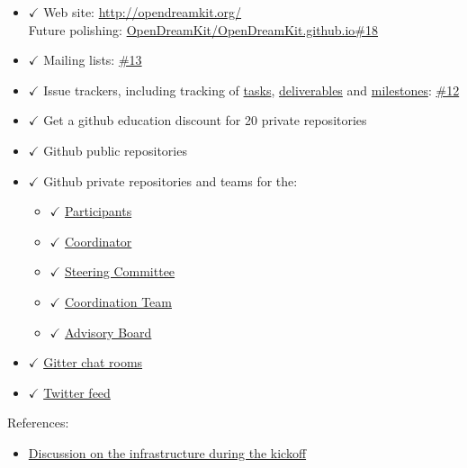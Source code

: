 \begin{itemize}
\tightlist
\item
  \(\checkmark\) Web site: \url{http://opendreamkit.org/}\\
  Future polishing:
  \href{https://github.com/OpenDreamKit/OpenDreamKit.github.io/issues/18}{OpenDreamKit/OpenDreamKit.github.io\#18}
\item
  \(\checkmark\) Mailing lists:
  \href{https://github.com/OpenDreamKit/OpenDreamKit/issues/13}{\#13}
\item
  \(\checkmark\) Issue trackers, including tracking of
  \href{https://github.com/OpenDreamKit/OpenDreamKit/labels/task?page=3\&q=is\%3Aopen+label\%3Atask}{tasks},
  \href{https://github.com/OpenDreamKit/OpenDreamKit/labels/deliverable?page=4\&q=is\%3Aopen+label\%3Adeliverable}{deliverables}
  and
  \href{https://github.com/OpenDreamKit/OpenDreamKit/milestones}{milestones}:
  \href{https://github.com/OpenDreamKit/OpenDreamKit/issues/12}{\#12}
\item
  \(\checkmark\) Get a github education discount for 20 private
  repositories
\item
  \(\checkmark\) Github public repositories
\item
  \(\checkmark\) Github private repositories and teams for the:

  \begin{itemize}
  \tightlist
  \item
    \(\checkmark\)
    \href{https://github.com/orgs/OpenDreamKit/teams/participants}{Participants}
  \item
    \(\checkmark\)
    \href{https://github.com/orgs/OpenDreamKit/teams/coordinator}{Coordinator}
  \item
    \(\checkmark\)
    \href{https://github.com/orgs/OpenDreamKit/teams/steering-committee}{Steering
    Committee}
  \item
    \(\checkmark\)
    \href{https://github.com/orgs/OpenDreamKit/teams/coordination}{Coordination
    Team}
  \item
    \(\checkmark\)
    \href{https://github.com/orgs/OpenDreamKit/teams/advisory}{Advisory
    Board}
  \end{itemize}
\item
  \(\checkmark\) \href{https://gitter.im/OpenDreamKit}{Gitter chat
  rooms}
\item
  \(\checkmark\) \href{https://twitter.com/opendreamkit}{Twitter feed}
\end{itemize}

References:

\begin{itemize}
\tightlist
\item
  \href{http://opendreamkit.org/meetings/2015-09-02-Kickoff/infrastructure/}{Discussion
  on the infrastructure during the kickoff}
\end{itemize}
